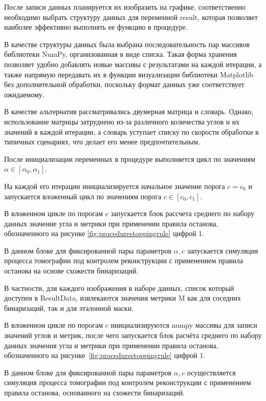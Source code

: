 После записи данных планируется их изобразить на графике, соответственно необходимо выбрать структуру данных для переменной result, которая позволяет наиболее эффективно выполнять ее функцию в процедуре.

В качестве структуры данных была выбрана последовательность пар массивов библиотеки NumPy, организованная в виде списка. Такая форма хранения позволяет удобно добавлять новые массивы с результатами на каждой итерации, а также напрямую передавать их в функции визуализации библиотеки Matplotlib без дополнительной обработки, поскольку формат данных уже соответствует ожидаемому.

В качестве альтернатив рассматривались двумерная матрица и словарь. Однако, использование матрицы затруднено из-за различного количества углов и их значений в каждой итерации, а словарь уступает списку по скорости обработки в типичных сценариях, что делает его менее предпочтительным.

После инициализации переменных в процедуре выполняется цикл по значениям \(\alpha \in [\alpha_0, \alpha_1]\).

На каждой его итерации инициализируется начальное значение порога \(c = c_0\) и запускается вложенный цикл по значениям порога \(c \in [c_0, c_1]\).

В вложенном цикле по порогам \(c\) запускается блок рассчета среднего по набору данных значение угла и метрики при применении правила останова, обозначенного на рисунке \ref*{fig:procedurestoppingrule} цифрой 1.

В данном блоке для фиксированной пары параметров \(\alpha, c\) запускается симуляция процесса томографии под контролем реконструкции с применением правила останова на основе схожести бинаризаций.

В частности, для каждого изображения в наборе данных, список который доступен в ResultData, извлекаются значения метрики M как для соседних бинаризаций, так и для эталонной маски.

В вложенном цикле по порогам \(c\) инициализируются numpy массивы для записи значений углов и метрик, после чего запускается блок расчёта среднего по набору данных значения угла и метрики при применении правила останова, обозначенного на рисунке~\ref*{fig:procedurestoppingrule} цифрой 1.

В данном блоке для фиксированной пары параметров \(\alpha, c\) осуществляется симуляция процесса томографии под контролем реконструкции с применением правила останова, основанного на схожести бинаризаций.

